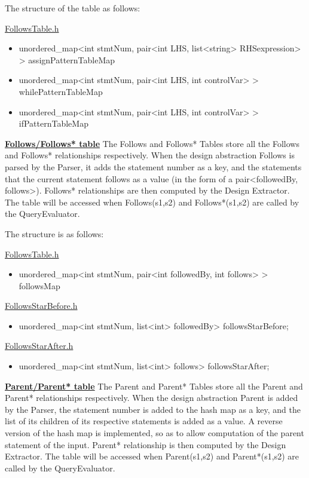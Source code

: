 \documentclass[12pt]{article}
\begin{document}
The structure of the table as follows:

{\underline{FollowsTable.h}
\begin{itemize}
\item unordered\_map<int stmtNum, pair<int LHS, list<string> RHSexpression> > assignPatternTableMap
\item unordered\_map<int stmtNum, pair<int LHS, int controlVar> > whilePatternTableMap
\item unordered\_map<int stmtNum, pair<int LHS, int controlVar> > ifPatternTableMap
\end{itemize}
\vspace{6mm}

\textbf{\underline{Follows/Follows* table}}
\newline The Follows and Follows* Tables store all the Follows and Follows* relationships respectively. When the design abstraction Follows is parsed by the Parser, it adds the statement number as a key, and the statements that the current statement follows as a value (in the form of a pair<followedBy, follows>). Follows* relationships are then computed by the Design Extractor. The table will be accessed when Follows(s1,s2) and Follows*(s1,s2) are called by the QueryEvaluator. 

The structure is as follows: 

{\underline{FollowsTable.h}
\begin{itemize}
\item unordered\_map<int stmtNum, pair<int followedBy, int follows> > followsMap
\end{itemize}
{\underline{FollowsStarBefore.h}
\begin{itemize}
\item unordered\_map<int stmtNum, list<int> followedBy> followsStarBefore;
\end{itemize}
{\underline{FollowsStarAfter.h}
\begin{itemize}
\item unordered\_map<int stmtNum, list<int> follows> followsStarAfter;
\end{itemize}
\vspace{6mm}

\textbf{\underline{Parent/Parent* table}}
\newline The Parent and Parent* Tables store all the Parent and Parent* relationships respectively. When the design abstraction Parent is added by the Parser, the statement number is added to the hash map as a key, and the list of its children of its respective statements is added as a value. A reverse version of the hash map is implemented, so as to allow computation of the parent statement of the input. Parent* relationship is then computed by the Design Extractor. The table will be accessed when Parent(s1,s2) and Parent*(s1,s2) are called by the QueryEvaluator. 

}}}}
\end{document}
